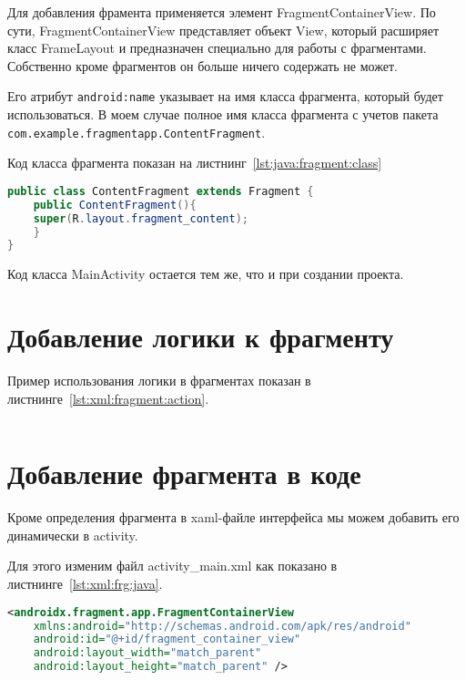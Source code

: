 Для добавления фрамента применяется элемент FragmentContainerView. По
сути, FragmentContainerView представляет объект View, который расширяет
класс FrameLayout и предназначен специально для работы с фрагментами.
Собственно кроме фрагментов он больше ничего содержать не может.\par
Его атрибут \texttt{android:name} указывает на имя класса фрагмента, который
будет использоваться. В моем случае полное имя класса фрагмента с учетов
пакета \texttt{com.example.fragmentapp.ContentFragment}.\par
Код класса фрагмента показан на листнинг~\ref{lst:java:fragment:class}

\begin{lstlisting}[language=Java
	, caption=\leftline{}
	, label=lst:java:fragment:class
	]
public class ContentFragment extends Fragment {
	public ContentFragment(){
	super(R.layout.fragment_content);
	}
}
\end{lstlisting}

Код класса MainActivity остается тем же, что и при создании проекта.

\section{Добавление логики к фрагменту}
Пример использования логики в фрагментах показан
в листнинге~\ref{lst:xml:fragment:action}.

\begin{lstlisting}[language=XML
	, caption=\leftline{}
	, label=lst:xml:fragment:action
	]
\end{lstlisting}

\section{Добавление фрагмента в коде}
Кроме определения фрагмента в xaml-файле интерфейса мы можем добавить
его динамически в activity.\par
Для этого изменим файл activity\_main.xml как показано в
листнинге~\ref{lst:xml:frg:java}.

\begin{lstlisting}[language=XML
	, caption=\leftline{}
	, label=lst:xml:frg:java
	]
<androidx.fragment.app.FragmentContainerView
	xmlns:android="http://schemas.android.com/apk/res/android"
	android:id="@+id/fragment_container_view"
	android:layout_width="match_parent"
	android:layout_height="match_parent" />
\end{lstlisting}

